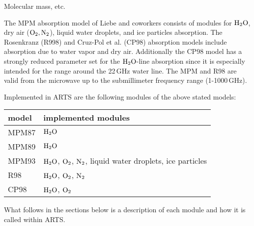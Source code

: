 {Molecular mass, etc. 


%
%
%
%
\label{levelb:CompAbsMod}
%
The MPM absorption model of Liebe and coworkers consists of modules for 
$\mbox{H}_2\mbox{O}$, dry air ($\mbox{O}_2, \mbox{N}_2$), liquid water droplets, and ice particles 
absorption. The Rosenkranz (R998) and Cruz-Pol et al. (CP98) absorption 
models include absorption due to water vapor and dry air. Additionally 
the CP98 model has a strongly reduced parameter set for the $\mbox{H}_2\mbox{O}$-line 
absorption since it is especially intended for the range around the 
22\,GHz water line. The MPM and R98 are valid from the microwave 
up to the submillimeter frequency range (1-1000\,GHz).

Implemented in ARTS are the following modules of the above stated models:
%
\begin{center}
\begin{tabular}{ll}
\hline
model & implemented modules \\
\hline
MPM87 & $\mbox{H}_2\mbox{O}$ \\
MPM89 & $\mbox{H}_2\mbox{O}$ \\
MPM93 & $\mbox{H}_2\mbox{O}$, $\mbox{O}_2$, $\mbox{N}_2$, liquid water droplets, ice particles \\
R98   & $\mbox{H}_2\mbox{O}$, $\mbox{O}_2$, $\mbox{N}_2$ \\
CP98  & $\mbox{H}_2\mbox{O}$, $\mbox{O}_2$ \\
\hline
\end{tabular}
\end{center}
%
What follows in the sections below is a description of each module and how it is 
called within ARTS.

}
